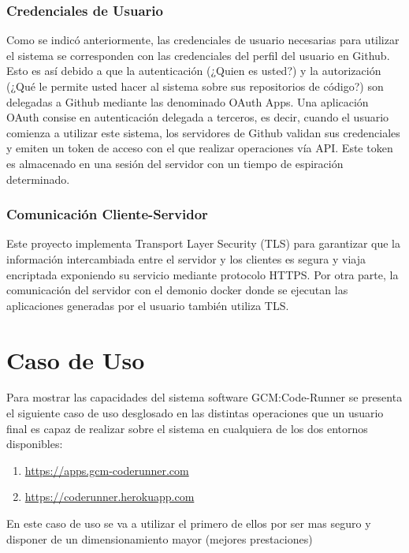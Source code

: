 \documentclass[a4paper,11pt]{book}
\begin{document}
\subsubsection{Credenciales de Usuario}

Como se indicó anteriormente, las credenciales de usuario necesarias para utilizar el sistema se corresponden con las credenciales del perfil del usuario en Github. Esto es así debido a que la autenticación (¿Quien es usted?) y la autorización (¿Qué le permite usted hacer al sistema sobre sus repositorios de código?) son delegadas a Github mediante las denominado OAuth Apps. Una aplicación OAuth consise en autenticación delegada a terceros, es decir, cuando el usuario comienza a utilizar este sistema, los servidores de Github validan sus credenciales y emiten un token de acceso con el que realizar operaciones vía API. Este token es almacenado en una sesión del servidor con un tiempo de espiración determinado. 

\subsubsection{Comunicación Cliente-Servidor}

Este proyecto implementa Transport Layer Security (TLS) para garantizar que la información intercambiada entre el servidor y los clientes es segura y viaja encriptada exponiendo su servicio mediante protocolo HTTPS. Por otra parte, la comunicación del servidor con el demonio docker donde se ejecutan las aplicaciones generadas por el usuario también utiliza TLS.

\section{Caso de Uso}

Para mostrar las capacidades del sistema software GCM:Code-Runner se presenta el siguiente caso de uso desglosado en las distintas operaciones que un usuario final es capaz de realizar sobre el sistema en cualquiera de los dos entornos disponibles:

\begin{enumerate}
\item \url{https://apps.gcm-coderunner.com}
\item \url{https://coderunner.herokuapp.com}
\end{enumerate}

En este caso de uso se va a utilizar el primero de ellos por ser mas seguro y disponer de un dimensionamiento mayor (mejores prestaciones)
\end{document}
